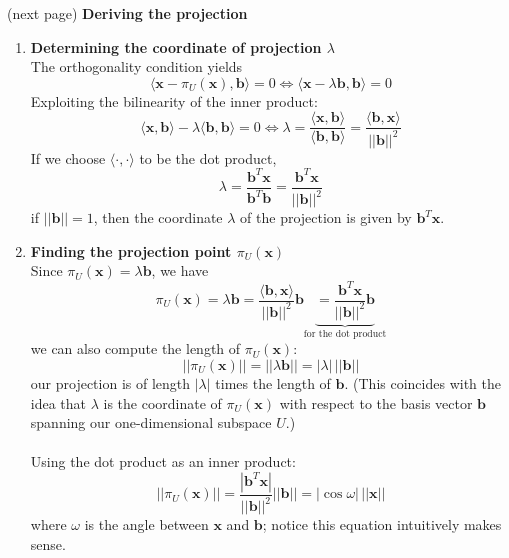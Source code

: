 \documentclass{report}
\begin{document}
(next page)
\newpage
\noindent\textbf{Deriving the projection}
\begin{enumerate}
\item\textbf{Determining the coordinate of projection $\lambda$}\\
The orthogonality condition yields
\begin{equation*}
\langle\bm{x}-\pi_U(\bm{x}),\bm{b}\rangle=0
\iff\langle\bm{x}-\lambda\bm{b},\bm{b}\rangle=0
\end{equation*}
Exploiting the bilinearity of the inner product:
\begin{equation*}
\langle\bm{x},\bm{b}\rangle-\lambda\langle\bm{b},\bm{b}\rangle=0\iff
\lambda=\frac{\langle\bm{x},\bm{b}\rangle}{\langle\bm{b},\bm{b}\rangle}=
\frac{\langle\bm{b},\bm{x}\rangle}{||\bm{b}||^2}
\end{equation*}
If we choose $\langle\cdot,\cdot\rangle$ to be the dot product,
\begin{equation*}
\lambda=\frac{\bm{b}^T\bm{x}}{\bm{b}^T\bm{b}}=\frac{\bm{b}^T\bm{x}}{||\bm{b}||^2}
\end{equation*}
if $||\bm{b}||=1$, then the coordinate $\lambda$ of the projection is given by
$\bm{b}^T\bm{x}$.
\item\textbf{Finding the projection point $\pi_U(\bm{x})$}\\
Since $\pi_U(\bm{x})=\lambda\bm{b}$, we have
\begin{equation*}
\pi_U(\bm{x})=\lambda\bm{b}=\frac{\langle\bm{b},\bm{x}\rangle}{||\bm{b}||^2}\bm{b}
\underbrace{=\frac{\bm{b}^T\bm{x}}{||\bm{b}||^2}\bm{b}}_{\text{for the dot product}}
\end{equation*}
we can also compute the length of $\pi_U(\bm{x})$:
\begin{equation*}
||\pi_U(\bm{x})||=||\lambda\bm{b}||=|\lambda|\,||\bm{b}||
\end{equation*}
our projection is of length $|\lambda|$ times the length of $\bm{b}$. (This coincides with the idea that 
$\lambda$ is the coordinate of $\pi_U(\bm{x})$ with respect to the basis vector $\bm{b}$ spanning our 
one-dimensional subspace $U$.)\\
\vspace{1mm}\\
Using the dot product as an inner product:
\begin{equation*}
||\pi_U(\bm{x})||=\frac{|\bm{b}^T\bm{x}|}{||\bm{b}||^2}||\bm{b}||
=|\cos\omega|\,||\bm{x}||
\end{equation*}
where $\omega$ is the angle between $\bm{x}$ and $\bm{b}$; notice this equation intuitively makes sense.\\

\end{enumerate}
\end{document}
